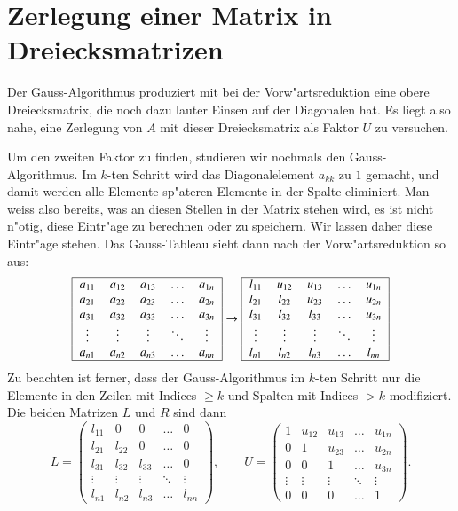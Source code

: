 \section{Zerlegung einer Matrix in Dreiecksmatrizen}
Der Gauss-Algorithmus produziert mit bei der Vorw"artsreduktion eine
obere Dreiecksmatrix, die noch dazu lauter Einsen auf der Diagonalen
hat.
Es liegt also nahe, eine Zerlegung von $A$ mit dieser Dreiecksmatrix
als Faktor $U$ zu versuchen.

Um den zweiten Faktor zu finden, studieren wir nochmals den
Gauss-Algorithmus.
Im $k$-ten Schritt wird das Diagonalelement
$a_{kk}$ zu $1$ gemacht, und damit werden alle Elemente sp"ateren
Elemente in der Spalte eliminiert.
Man weiss also bereits, was an
diesen Stellen in der Matrix stehen wird, es ist nicht n"otig, diese
Eintr"age zu berechnen oder zu speichern.
Wir lassen daher diese Eintr"age stehen.
Das Gauss-Tableau sieht dann nach der Vorw"artsreduktion
so aus:
\[
\begin{tabular}{|>{$}c<{$}>{$}c<{$}>{$}c<{$}>{$}c<{$}>{$}c<{$}|}
\hline
a_{11}&a_{12}&a_{13}&\dots &a_{1n}\\
a_{21}&a_{22}&a_{23}&\dots &a_{2n}\\
a_{31}&a_{32}&a_{33}&\dots &a_{3n}\\
\vdots&\vdots&\vdots&\ddots&\vdots\\
a_{n1}&a_{n2}&a_{n3}&\dots &a_{nn}\\
\hline
\end{tabular}
\rightarrow
\begin{tabular}{|>{$}c<{$}>{$}c<{$}>{$}c<{$}>{$}c<{$}>{$}c<{$}|}
\hline
l_{11}&u_{12}&u_{13}&\dots &u_{1n}\\
l_{21}&l_{22}&u_{23}&\dots &u_{2n}\\
l_{31}&l_{32}&l_{33}&\dots &u_{3n}\\
\vdots&\vdots&\vdots&\ddots&\vdots\\
l_{n1}&l_{n2}&l_{n3}&\dots &l_{nn}\\
\hline
\end{tabular}
\]
Zu beachten ist ferner, dass der Gauss-Algorithmus im $k$-ten Schritt nur 
die Elemente in den Zeilen mit Indices $\ge k$ und Spalten mit Indices $>k$ 
modifiziert.
Die beiden Matrizen $L$ und $R$ sind dann
\[
L=\begin{pmatrix}
l_{11}&0     &0     &\dots &0\\
l_{21}&l_{22}&0     &\dots &0\\
l_{31}&l_{32}&l_{33}&\dots &0\\
\vdots&\vdots&\vdots&\ddots&\vdots\\
l_{n1}&l_{n2}&l_{n3}&\dots &l_{nn}
\end{pmatrix},
\qquad
U=
\begin{pmatrix}
1     &u_{12}&u_{13}&\dots &u_{1n}\\
0     &1     &u_{23}&\dots &u_{2n}\\
0     &0     &1     &\dots &u_{3n}\\
\vdots&\vdots&\vdots&\ddots&\vdots\\
0     &0     &0     &\dots &1
\end{pmatrix}.
\]
